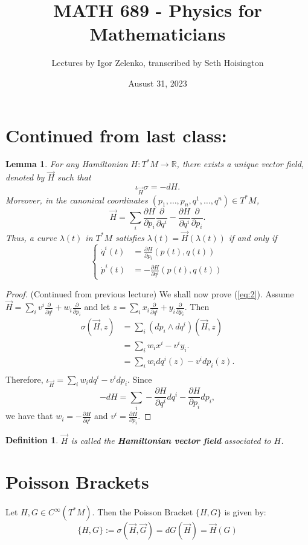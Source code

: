 \documentclass{article}
\title{MATH 689 - Physics for Mathematicians}
\author{Lectures by Igor Zelenko, transcribed by Seth Hoisington}
\date{Ausust 31, 2023}
\newcommand{\R}{\mathbb R}
\newcommand{\pd}[1]{\frac{\partial}{\partial #1}}
\newcommand{\pdof}[2]{\frac{\partial #1}{\partial #2}}
\newtheorem{defn}{Definition}
\newtheorem{lm}{Lemma}
\begin{document}
\maketitle
\section{Continued from last class:}
\begin{lm}
    For any Hamiltonian $H:T^*M\to \R$, there exists a unique vector field, denoted by $\vec{H}$ such that 
    \begin{equation}
        \iota_{\vec H} \sigma = -dH.
    \end{equation}
    Moreover, in the canonical coordinates $(p_1,\dots, p_n,q^1,\dots,q^n)\in T^*M$,
    \begin{equation}\label{eq:2}
        \vec H = \sum_{i} \pdof{H}{p_i}\pd{q^i} - \pdof{H}{q^i}\pd{p_i}.
    \end{equation}
    Thus, a curve $\lambda(t)$ in $T^*M$ satisfies $\lambda(t) = \vec H(\lambda(t))$ if and only if 
    \[\left\{\begin{aligned}
        \dot q^i(t) &= \pdof{H}{p_i}(p(t), q(t))\\
        \dot p^i(t) &= -\pdof{H}{q^i}(p(t), q(t))
    \end{aligned}\right.\]
\end{lm}
\begin{proof}
    (Continued from previous lecture) We shall now prove (\ref{eq:2}). Assume $\vec H = \sum_{i} v^i\pd{q^i} + w_i\pd{p_i}$ and let $z = \sum_{i} x_i\pd{q^i} + y_i\pd{p_i}$. Then
    \begin{align*}
        \sigma(\vec{H},z) &= \sum_i (dp_i\wedge dq^i)(\vec{H},z)\\
        &=\sum_i w_ix^i - v^iy_i.\\
        &=\sum_i w_idq^i(z) - v^idp_i(z).\\
    \end{align*}
    Therefore, $\iota_{\vec H} = \sum_i w_idq^i - v^idp_i$. Since
    \[-dH = \sum_i -\pdof{H}{q^i}dq^i - \pdof{H}{p_i}dp_i,\]
    we have that $w_i = -\pdof{H}{q^i}$ and $v^i = \pdof{H}{p_i}$.
\end{proof}
\begin{defn}
    $\vec H$ is called the \textbf{Hamiltonian vector field} associated to $H$.
\end{defn}
\section{Poisson Brackets}
Let $H,G\in C^\infty(T^*M)$. Then the Poisson Bracket $\{H,G\}$ is given by:
\[\{H,G\}:= \sigma(\vec{H},\vec G) = dG(\vec H) = \vec H(G)\]
\end{document}
